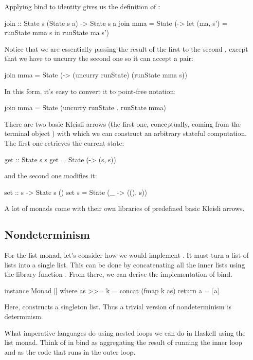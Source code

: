 \documentclass[DaoFP]{subfiles}
\begin{document}
Applying bind to identity gives us the definition of :
\begin{haskell}
join :: State s (State s a) -> State s a
join mma = State (\s -> let (ma, s') = runState mma s
                        in runState ma s')
\end{haskell}
Notice that we are essentially passing the result of the first  to the second , except that we have to uncurry the second one so it can accept a pair:
                             
\begin{haskell}
join mma = State (\s -> (uncurry runState) (runState mma s))
\end{haskell}
In this form, it's easy to convert it to point-free notation:
\begin{haskell}
join mma = State (uncurry runState . runState mma)
\end{haskell}

There are two basic Kleisli arrows (the first one, conceptually, coming from the terminal object \hask{()}) with which we can construct an arbitrary stateful computation. The first one retrieves the current state:
\begin{haskell}
get :: State s s
get = State (\s -> (s, s))
\end{haskell}
and the second one modifies it:
\begin{haskell}
set :: s -> State s ()
set s = State (\_ -> ((), s))
\end{haskell}
A lot of monads come with their own libraries of predefined basic Kleisli arrows.
\subsection{Nondeterminism}

For the list monad, let's consider how we would implement . It must turn a list of lists into a single list. This can be done by concatenating all the inner lists using the library function . From there, we can derive the implementation of bind.
\begin{haskell}
instance Monad [] where
  as >>= k = concat (fmap k as)
  return a = [a]
\end{haskell}
Here,  constructs a singleton list. Thus a trivial version of nondeterminism is determinism.

What imperative languages do using nested loops we can do in Haskell using the list monad. Think of  in bind as aggregating the result of running the inner loop and  as the code that runs in the outer loop. 
\end{document}
